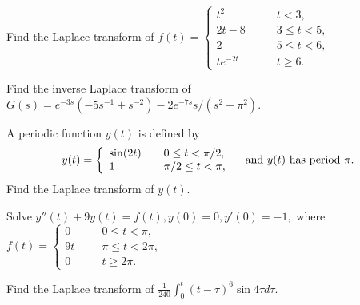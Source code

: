  




\item
Find the Laplace transform of 
$f(t)=\left\{\begin{array}{ll}
t^2\qquad & t<3,\\
2t-8\qquad & 3\le t<5,\\
2\qquad & 5\le t<6,\\
te^{-2t}\qquad & t\ge 6.
\end{array}\right.$

\item
Find the inverse Laplace transform of 
$G(s)=e^{-3s} (-5s^{-1} +s^{-2}) -2e^{-7s}s/(s^2+\pi^2)$.


\def\LaplacePeriodic{
\item
A periodic function $y(t)$ is defined by
$$
y(t)=\left\{\begin{array}{ll}
\sin(2t)\quad & 0\le t<\pi/2,\\
1\quad & \pi/2\le t<\pi,
\end{array} \right.
\quad
\mbox{\rm   and $y(t)$ has period $\pi$.}
$$
Find the Laplace transform of $y(t)$. 
}

\LaplacePeriodic


\item
Solve $y''(t)+9y(t)=f(t),y(0)=0,y'(0)=-1,$
where $f(t)=\left\{\begin{array}{ll}
0\quad & 0\le t<\pi,\\
9t\quad & \pi\le t<2\pi,\\
0\qquad & t\ge 2\pi.
\end{array} \right.$


\def\LaplaceConvolution{
\item 
Find the Laplace transform of 
$\displaystyle \frac{1}{240} \int_0^t (t-\tau)^6 \sin 4\tau d\tau$.
}

\LaplaceConvolution


\def\LaplaceImpulse{
\item
	\begin{enumerate}
	\item
Solve $h''+4h'+3h=\delta(t), h(0)=0,h'(0)=0$.
	\item
Express the forced response of 
$y''+4y'+3y=f(t), y(0)=0,y'(0)=0$, 
using a convolution integral.
	\item
Use the result in (a)(b) to solve
$y''+4y'+3y=\frac{1}{1+e^t}, y(0)=0,y'(0)=0.$
	\end{enumerate}
}

